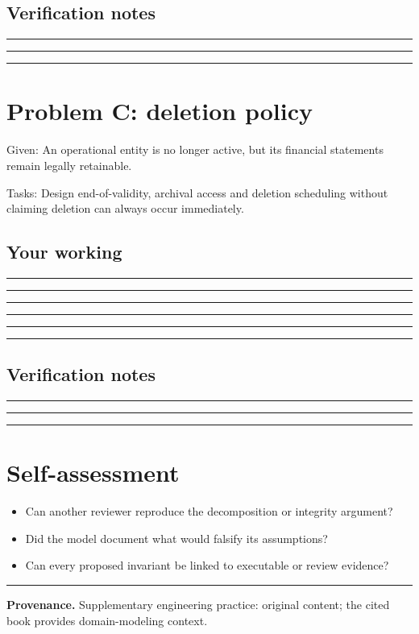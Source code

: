 \documentclass[11pt,letterpaper]{article}
\newcommand{\ResponseLine}{\par\vspace{1.05em}\noindent\rule{\linewidth}{0.4pt}\par}
\newcommand{\ResponseArea}{\ResponseLine\ResponseLine\ResponseLine}
\begin{document}
\subsection{Verification notes}
\ResponseArea

\section{Problem C: deletion policy}
Given: An operational entity is no longer active, but its financial statements remain legally retainable.

Tasks: Design end-of-validity, archival access and deletion scheduling without claiming deletion can always occur immediately.

\subsection{Your working}
\ResponseArea\ResponseArea
\subsection{Verification notes}
\ResponseArea

\section{Self-assessment}
\begin{itemize}
\item Can another reviewer reproduce the decomposition or integrity argument?
\item Did the model document what would falsify its assumptions?
\item Can every proposed invariant be linked to executable or review evidence?
\end{itemize}

\vfill
\hrule
{\footnotesize\textbf{Provenance.} Supplementary engineering practice: original content; the cited book provides domain-modeling context.}
\end{document}

